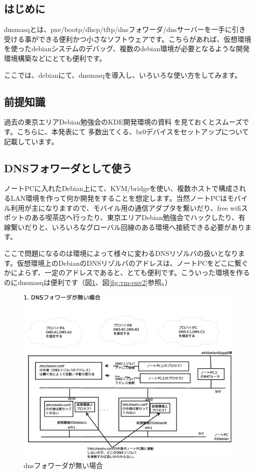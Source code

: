 \documentclass[mingoth,a4paper]{jsarticle}
\begin{document}
\subsection{はじめに}

 dnsmasqとは、pxe/bootp/dhcp/tftp/dnsフォワーダ/dnsサーバーを一手に引き受ける事ができる便利かつ小さなソフトウェアです。こちらがあれば、仮想環境を使ったdebianシステムのデバッグ、複数のdebian環境が必要となるような開発環境構築などにとても便利です。

 ここでは、debianにて、dnsmasqを導入し、いろいろな使い方をしてみます。

\subsection{前提知識}

 過去の東京エリアDebian勉強会のKDE開発環境の資料
\cite{kde-devel-debian}を見ておくとスムーズです。こちらに、本発表にて
多数出てくる、br0デバイスをセットアップについて記載しています。

\subsection{DNSフォワーダとして使う}

 ノートPCに入れたDebian上にて、KVM/bridgeを使い、複数ホストで構成されるLAN環境を作って何か開発をすることを想定します。当然ノートPCはモバイル利用が主になりますので、モバイル用の通信アダプタを繋いだり、free wifiスポットのある喫茶店へ行ったり、東京エリアDebian勉強会でハックしたり、有線繋いだりと、いろいろなグローバル回線のある環境へ接続できる必要があります。

 ここで問題になるのは環境によって様々に変わるDNSリゾルバの扱いとなります。仮想環境上のDebianのDNSリゾルバのアドレスは、ノートPCをどこに繋ぐかによらず、一定のアドレスであると、とても便利です。こういった環境を作るのにdnsmasqは便利です（図\ref{fig:vm-env1}、図\ref{fig:vm-env2}参照。）

\begin{figure}[H]
\begin{center}
 \includegraphics[width=0.5\hsize]{image201402/vm-dns-env.eps}
 \caption{dnsフォワーダが無い場合}\label{fig:vm-env1}
\end{center}
\end{figure}
\end{document}
